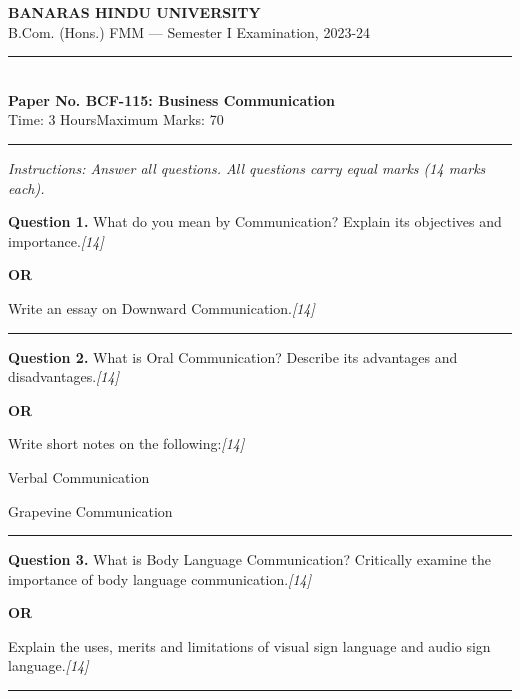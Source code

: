 \documentclass[11pt,a4paper]{article}
\newcommand{\pts}[1]{\hfill   \textit{[#1]}}
\begin{document}
\begin{center}
  {\large\bfseries BANARAS HINDU UNIVERSITY}\\[2pt]
  {\normalsize B.Com. (Hons.) FMM --- Semester I Examination, 2023-24}\\[6pt]
  \rule{0.8\linewidth}{0.5pt}\\[6pt]
  {\large\bfseries Paper No. BCF-115: Business Communication}\\[4pt]
  {\normalsize Time: 3 Hours\hfill Maximum Marks: 70}
\end{center}

\rule{\linewidth}{0.4pt}

\smallskip



\noindent   \textit{Instructions: Answer all questions. All questions carry equal marks (14 marks each).}

\bigskip




\noindent   \textbf{Question 1.}
What do you mean by Communication? Explain its objectives and importance.\pts{14}

\centerline{   \textbf{OR}}

Write an essay on Downward Communication.\pts{14}

\medskip\rule{\linewidth}{0.2pt}




\noindent   \textbf{Question 2.}
What is Oral Communication? Describe its advantages and disadvantages.\pts{14}

\centerline{   \textbf{OR}}

Write short notes on the following:\pts{14}

\begin{parts}
  \item Verbal Communication
  \item Grapevine Communication
\end{parts}

\medskip\rule{\linewidth}{0.2pt}




\noindent   \textbf{Question 3.}
What is Body Language Communication? Critically examine the importance of body language communication.\pts{14}

\centerline{   \textbf{OR}}

Explain the uses, merits and limitations of visual sign language and audio sign language.\pts{14}

\medskip\rule{\linewidth}{0.2pt}
\end{document}
